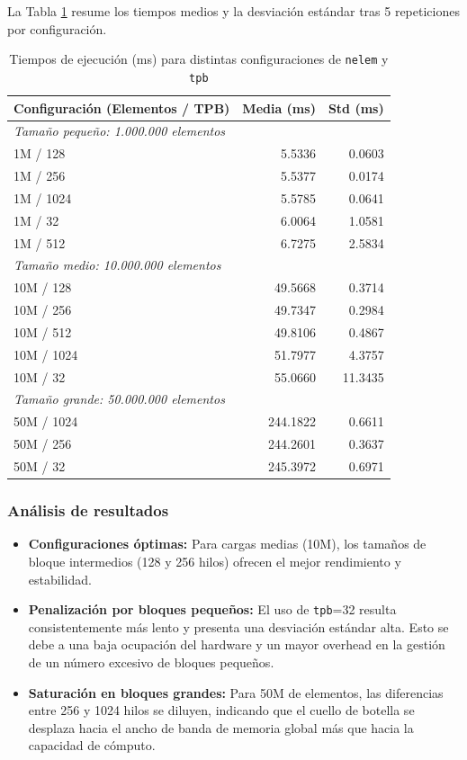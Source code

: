 \documentclass[12pt,a4paper]{report}
\begin{document}
La Tabla \ref{tab:vectoradd_times} resume los tiempos medios y la desviación estándar tras 5 repeticiones por configuración.

\begin{table}[H]
\centering
\caption{Tiempos de ejecución (ms) para distintas configuraciones de \texttt{nelem} y \texttt{tpb}}
\label{tab:vectoradd_times}
\begin{tabular}{l r r}
    \toprule
    \textbf{Configuración (Elementos / TPB)} & \textbf{Media (ms)} & \textbf{Std (ms)} \\
    \midrule
    \multicolumn{3}{l}{\textit{Tamaño pequeño: 1.000.000 elementos}} \\
    1M / 128  & 5.5336 & 0.0603 \\
    1M / 256  & 5.5377 & 0.0174 \\
    1M / 1024 & 5.5785 & 0.0641 \\
    1M / 32   & 6.0064 & 1.0581 \\
    1M / 512  & 6.7275 & 2.5834 \\
    \midrule
    \multicolumn{3}{l}{\textit{Tamaño medio: 10.000.000 elementos}} \\
    10M / 128  & 49.5668 & 0.3714 \\
    10M / 256  & 49.7347 & 0.2984 \\
    10M / 512  & 49.8106 & 0.4867 \\
    10M / 1024 & 51.7977 & 4.3757 \\
    10M / 32   & 55.0660 & 11.3435 \\
    \midrule
    \multicolumn{3}{l}{\textit{Tamaño grande: 50.000.000 elementos}} \\
    50M / 1024 & 244.1822 & 0.6611 \\
    50M / 256  & 244.2601 & 0.3637 \\
    50M / 32   & 245.3972 & 0.6971 \\
    \bottomrule
\end{tabular}
\end{table}

\subsubsection*{Análisis de resultados}
\begin{itemize}
    \item \textbf{Configuraciones óptimas:} Para cargas medias (10M), los tamaños de bloque intermedios (128 y 256 hilos) ofrecen el mejor rendimiento y estabilidad.
    \item \textbf{Penalización por bloques pequeños:} El uso de \texttt{tpb}=32 resulta consistentemente más lento y presenta una desviación estándar alta. Esto se debe a una baja ocupación del hardware y un mayor overhead en la gestión de un número excesivo de bloques pequeños.
    \item \textbf{Saturación en bloques grandes:} Para 50M de elementos, las diferencias entre 256 y 1024 hilos se diluyen, indicando que el cuello de botella se desplaza hacia el ancho de banda de memoria global más que hacia la capacidad de cómputo.
\end{itemize}
\end{document}

